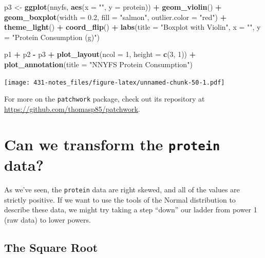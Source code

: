 \documentclass[
]{book}
\newenvironment{Shaded}{\begin{snugshade}}{\end{snugshade}}
\newcommand{\DataTypeTok}[1]{\textcolor[rgb]{0.13,0.29,0.53}{#1}}
\newcommand{\DecValTok}[1]{\textcolor[rgb]{0.00,0.00,0.81}{#1}}
\newcommand{\FloatTok}[1]{\textcolor[rgb]{0.00,0.00,0.81}{#1}}
\newcommand{\KeywordTok}[1]{\textcolor[rgb]{0.13,0.29,0.53}{\textbf{#1}}}
\newcommand{\NormalTok}[1]{#1}
\newcommand{\OperatorTok}[1]{\textcolor[rgb]{0.81,0.36,0.00}{\textbf{#1}}}
\newcommand{\StringTok}[1]{\textcolor[rgb]{0.31,0.60,0.02}{#1}}
\begin{document}
\begin{Shaded}
\begin{Highlighting}[]
\NormalTok{p3 <-}\StringTok{ }\KeywordTok{ggplot}\NormalTok{(nnyfs, }\KeywordTok{aes}\NormalTok{(}\DataTypeTok{x =} \StringTok{""}\NormalTok{, }\DataTypeTok{y =}\NormalTok{ protein)) }\OperatorTok{+}
\StringTok{    }\KeywordTok{geom_violin}\NormalTok{() }\OperatorTok{+}
\StringTok{    }\KeywordTok{geom_boxplot}\NormalTok{(}\DataTypeTok{width =} \FloatTok{0.2}\NormalTok{, }\DataTypeTok{fill =} \StringTok{"salmon"}\NormalTok{, }
                 \DataTypeTok{outlier.color =} \StringTok{"red"}\NormalTok{) }\OperatorTok{+}
\StringTok{    }\KeywordTok{theme_light}\NormalTok{() }\OperatorTok{+}
\StringTok{    }\KeywordTok{coord_flip}\NormalTok{() }\OperatorTok{+}
\StringTok{    }\KeywordTok{labs}\NormalTok{(}\DataTypeTok{title =} \StringTok{"Boxplot with Violin"}\NormalTok{,}
         \DataTypeTok{x =} \StringTok{""}\NormalTok{, }\DataTypeTok{y =} \StringTok{"Protein Consumption (g)"}\NormalTok{)}

\NormalTok{p1 }\OperatorTok{+}\StringTok{ }\NormalTok{p2 }\OperatorTok{-}\StringTok{ }\NormalTok{p3 }\OperatorTok{+}\StringTok{ }\KeywordTok{plot_layout}\NormalTok{(}\DataTypeTok{ncol =} \DecValTok{1}\NormalTok{, }\DataTypeTok{height =} \KeywordTok{c}\NormalTok{(}\DecValTok{3}\NormalTok{, }\DecValTok{1}\NormalTok{)) }\OperatorTok{+}
\StringTok{    }\KeywordTok{plot_annotation}\NormalTok{(}\DataTypeTok{title =} \StringTok{"NNYFS Protein Consumption"}\NormalTok{)}
\end{Highlighting}
\end{Shaded}

\texttt{[image: 431-notes\_files/figure-latex/unnamed-chunk-50-1.pdf]}

For more on the \texttt{patchwork} package, check out its repository at \url{https://github.com/thomasp85/patchwork}.

\hypertarget{can-we-transform-the-protein-data}{%
\section{\texorpdfstring{Can we transform the \texttt{protein} data?}{Can we transform the protein data?}}\label{can-we-transform-the-protein-data}}

As we've seen, the \texttt{protein} data are right skewed, and all of the values are strictly positive. If we want to use the tools of the Normal distribution to describe these data, we might try taking a step ``down'' our ladder from power 1 (raw data) to lower powers.

\hypertarget{the-square-root}{%
\subsection{The Square Root}\label{the-square-root}}
\end{document}
